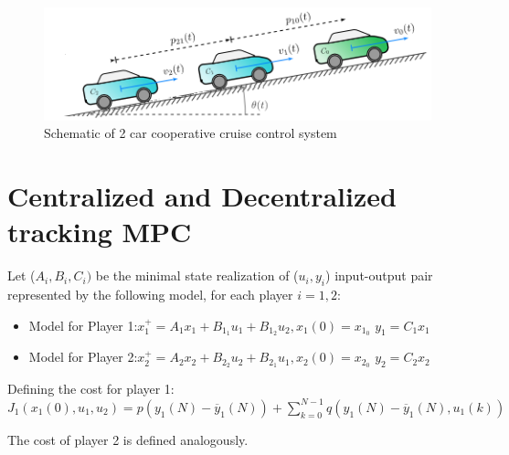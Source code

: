 \documentclass[a4paper,twocolumn]{article}
\begin{document}
\begin{figure}
	\centering
	\includegraphics[width=15cm]{Untitled.png}
	\caption{Schematic of 2 car cooperative cruise control system}
	\label{fig:cruise-2car-system}
\end{figure}


\section{Centralized and Decentralized tracking MPC}\label{sec:2}
Let ($A_i, B_i, C_i)$ be the minimal state realization of ($u_i, y_i$) input-output pair \cite{Ding2012} represented by the following model, for each player $i = 1,2$:
\begin{itemize}
    \item Model for Player 1:\newline$x_1^+ = A_1x_1 + B_1_1u_1 + B_1_2u_2, x_1(0) = x_1_0$
\newline $y_1 = C_1x_1$
    \item Model for Player 2:\newline$x_2^+ = A_2x_2 + B_2_2u_2 + B_2_1u_1, x_2(0) = x_2_0$
\newline $y_2 = C_2x_2$
\end{itemize}
\newline
Defining the cost for player 1:
$J_1(x_1(0),u_1,u_2) = p(y_1(N)-\overline{y}_1(N)) + \sum_{k=0}^{N-1} q(y_1(N)-\overline{y}_1(N),u_1(k))$

The cost of player 2 is defined analogously.
\end{document}
